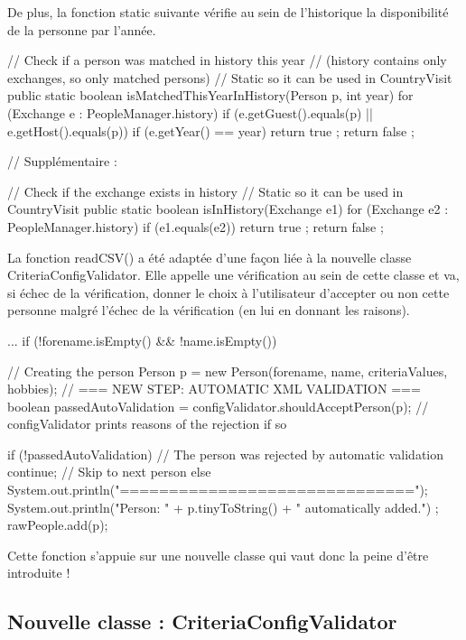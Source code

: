\documentclass{mytex}
\begin{document}
De plus, la fonction static suivante vérifie au sein de l'historique la disponibilité de la personne par l'année.

\begin{codebox}
// Check if a person was matched in history this year
// (history contains only exchanges, so only matched persons)
// Static so it can be used in CountryVisit
public static boolean isMatchedThisYearInHistory(Person p, int year) {
	for (Exchange e : PeopleManager.history) {
		if (e.getGuest().equals(p) || e.getHost().equals(p)) {
			if (e.getYear() == year) {
				return true ;
			}
		}
	}
	return false ;
}

// Supplémentaire :

// Check if the exchange exists in history
// Static so it can be used in CountryVisit
public static boolean isInHistory(Exchange e1) {
	for (Exchange e2 : PeopleManager.history) {
		if (e1.equals(e2)) return true ;
	}
	return false ;
}
\end{codebox}


La fonction readCSV() a été adaptée d'une façon liée à la nouvelle classe CriteriaConfigValidator. Elle appelle une vérification au sein de cette classe et va, si échec de la vérification, donner le choix à l'utilisateur d'accepter ou non cette personne malgré l'échec de la vérification (en lui en donnant les raisons).

\begin{codebox}
...
if (!forename.isEmpty() && !name.isEmpty()) {
	// Creating the person
	Person p = new Person(forename, name, criteriaValues, hobbies);
	// === NEW STEP: AUTOMATIC XML VALIDATION ===
	boolean passedAutoValidation = configValidator.shouldAcceptPerson(p);
	// configValidator prints reasons of the rejection if so
	
	if (!passedAutoValidation) {
		// The person was rejected by automatic validation
		continue; // Skip to next person
	} else {
		System.out.println("\n==============================\n");
		System.out.println("Person: " + p.tinyToString() + " automatically added.") ;
		rawPeople.add(p);
	}
}
\end{codebox}

Cette fonction s'appuie sur une nouvelle classe qui vaut donc la peine d'être introduite !

\subsection{Nouvelle classe : CriteriaConfigValidator}
\end{document}
